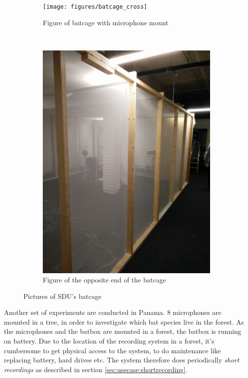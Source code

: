 \begin{figure}[!h]
    \centering
    \begin{subfigure}[b]{0.45\textwidth}
        \texttt{[image: figures/batcage\_cross]}
        \caption{Figure of batcage with microphone mount}
        \label{fig:gull}
    \end{subfigure}
    ~ %
    \begin{subfigure}[b]{0.45\textwidth}
        \includegraphics[width=\textwidth]{figures/batcage}
        \caption{Figure of the opposite end of the batcage}
        \label{fig:mouse}
    \end{subfigure}
    \caption{Pictures of SDU's batcage}\label{fig:usecase:batcage}
\end{figure}

Another set of experiments are conducted in Panama. 8 microphones are mounted in a tree, in order to investigate which bat species live in the forest. As the microphones and the batbox are mounted in a forest, the batbox is running on battery. Due to the location of the recording system in a forest, it's cumbersome to get physical access to the system, to do maintenance like replacing battery, hard drives etc. The system therefore does periodically \textit{short recordings} as described in section \ref{sec:usecase:shortrecording}. 

